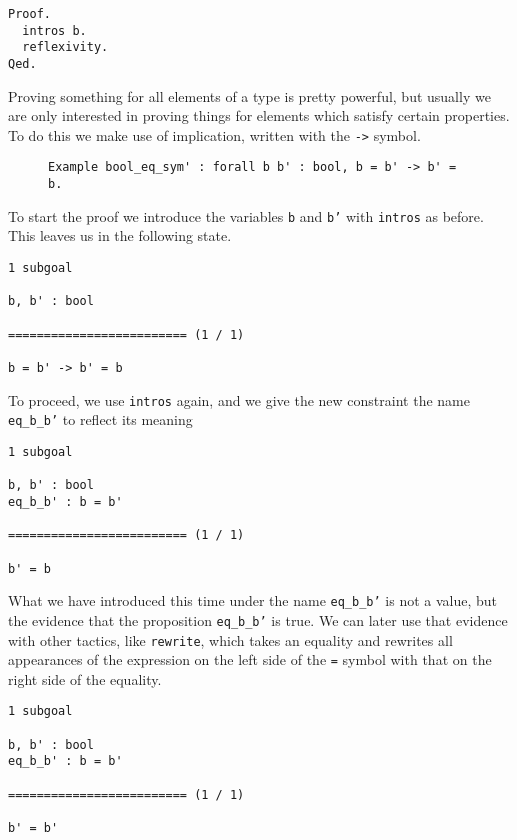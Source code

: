 \begin{verbatim}
Proof.
  intros b.
  reflexivity.
Qed.
\end{verbatim}

Proving something for all elements of a type is pretty powerful, but usually we are only interested in
proving things for elements which satisfy certain properties. To do this we make use of implication,
written with the \texttt{->} symbol.
\begin{figure}[!ht]
\begin{verbatim}
Example bool_eq_sym' : forall b b' : bool, b = b' -> b' = b.
\end{verbatim}
\label{lst:bool-eq-sym}
\end{figure}

To start the proof we introduce the variables \texttt{b} and \texttt{b'} with 
\texttt{intros} as before. This leaves us in the following state.

\begin{verbatim}
1 subgoal

b, b' : bool

========================= (1 / 1)

b = b' -> b' = b
\end{verbatim}

To proceed, we use \texttt{intros} again, and we give the new constraint the name \texttt{eq_b_b'}
to reflect its meaning

\begin{verbatim}
1 subgoal

b, b' : bool
eq_b_b' : b = b'

========================= (1 / 1)

b' = b
\end{verbatim}

What we have introduced this time under the name \texttt{eq_b_b'} is not a value, but the
evidence that the proposition \texttt{eq_b_b'} is true. We can later use that evidence with
other tactics, like \texttt{rewrite}, which takes an equality and rewrites all appearances of
the expression on the left side of the \texttt{=} symbol with that on the right side of the 
equality.

\begin{verbatim}
1 subgoal

b, b' : bool
eq_b_b' : b = b'

========================= (1 / 1)

b' = b'
\end{verbatim}

